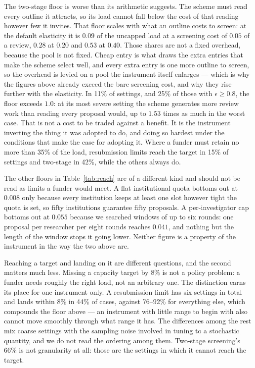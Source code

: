 \documentclass[11pt,a4paper]{article}
\begin{document}
The two-stage floor is worse than its arithmetic suggests. The scheme must read
every outline it attracts, so its load cannot fall below the cost of that reading
however few it invites. That floor scales with what an outline costs to screen:
at the default elasticity it is $0.09$ of the uncapped load at a screening cost
of $0.05$ of a review, $0.28$ at $0.20$ and $0.53$ at $0.40$. Those shares are
not a fixed overhead, because the pool is not fixed. Cheap entry is what draws
the extra entries that make the scheme select well, and every extra entry is one
more outline to screen, so the overhead is levied on a pool the instrument itself
enlarges --- which is why the figures above already exceed the bare screening
cost, and why they rise further with the elasticity. In 11\% of settings, and 25\%
of those with $\epsilon \ge 0.8$, the floor exceeds $1.0$: at its most severe
setting the scheme generates more review work than reading every proposal would,
up to $1.53$ times as much in the worst case. That is not a cost to be traded
against a benefit. It is the instrument inverting the thing it was adopted to do,
and doing so hardest under the conditions that make the case for adopting it.
Where a funder must retain no more than 35\% of the load, resubmission limits
reach the target in 15\% of settings and two-stage in 42\%, while the others
always do.

The other floors in Table~\ref{tab:reach} are of a different kind and should not
be read as limits a funder would meet. A flat institutional quota bottoms out at
$0.008$ only because every institution keeps at least one slot however tight the
quota is set, so fifty institutions guarantee fifty proposals. A per-investigator
cap bottoms out at $0.055$ because we searched windows of up to six rounds: one
proposal per researcher per eight rounds reaches $0.041$, and nothing but the
length of the window stops it going lower. Neither figure is a property of the
instrument in the way the two above are.

Reaching a target and landing on it are different questions, and the second
matters much less. Missing a capacity target by 8\% is not a policy problem: a
funder needs roughly the right load, not an arbitrary one. The distinction earns
its place for one instrument only. A resubmission limit has six settings in total
and lands within 8\% in 44\% of cases, against 76--92\% for everything else,
which compounds the floor above --- an instrument with little range to begin with
also cannot move smoothly through what range it has. The differences among the
rest mix coarse settings with the sampling noise involved in tuning to a
stochastic quantity, and we do not read the ordering among them. Two-stage
screening's 66\% is not granularity at all: those are the settings in which it
cannot reach the target.
\end{document}
